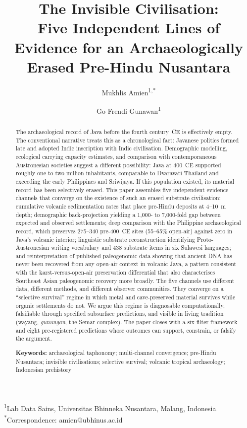 \documentclass[12pt,a4paper]{article}
\begin{document}
\title{The Invisible Civilisation:\\Five Independent Lines of Evidence for an Archaeologically Erased Pre-Hindu Nusantara}

\author{Mukhlis Amien\textsuperscript{1,*} \and Go Frendi Gunawan\textsuperscript{1}}

\date{}

\maketitle

\noindent\textsuperscript{1}Lab Data Sains, Universitas Bhinneka Nusantara, Malang, Indonesia\\
\textsuperscript{*}Correspondence: amien@ubhinus.ac.id

\begin{abstract}
The archaeological record of Java before the fourth century~CE is effectively empty. The conventional narrative treats this as a chronological fact: Javanese polities formed late and adopted Indic inscription with Indic civilisation. Demographic modelling, ecological carrying capacity estimates, and comparison with contemporaneous Austronesian societies suggest a different possibility: Java at 400~CE supported roughly one to two million inhabitants, comparable to Dvaravati Thailand and exceeding the early Philippines and Sriwijaya. If this population existed, its material record has been selectively erased. This paper assembles five independent evidence channels that converge on the existence of such an erased substrate civilisation: cumulative volcanic sedimentation rates that place pre-Hindu deposits at 4--10~m depth; demographic back-projection yielding a 1{,}000- to 7{,}000-fold gap between expected and observed settlements; deep comparison with the Philippine archaeological record, which preserves 275--340 pre-400~CE sites (55--65\% open-air) against zero in Java's volcanic interior; linguistic substrate reconstruction identifying Proto-Austronesian writing vocabulary and 438 substrate items in six Sulawesi languages; and reinterpretation of published paleogenomic data showing that ancient DNA has never been recovered from any open-air context in volcanic Java, a pattern consistent with the karst-versus-open-air preservation differential that also characterises Southeast Asian paleogenomic recovery more broadly. The five channels use different data, different methods, and different observer communities. They converge on a ``selective survival'' regime in which metal and cave-preserved material survives while organic settlements do not. We argue this regime is diagnosable computationally, falsifiable through specified subsurface predictions, and visible in living tradition (wayang, \textit{gunungan}, the Semar complex). The paper closes with a six-filter framework and eight pre-registered predictions whose outcomes can support, constrain, or falsify the argument.

\medskip
\noindent\textbf{Keywords:} archaeological taphonomy; multi-channel convergence; pre-Hindu Nusantara; invisible civilisations; selective survival; volcanic tropical archaeology; Indonesian prehistory
\end{abstract}
\end{document}

